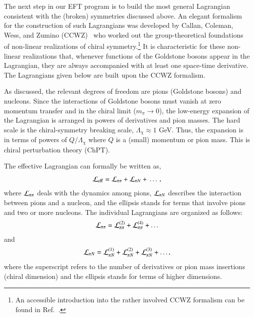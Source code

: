 \documentclass[sort&compress,preprint,3p]{elsarticle}
\begin{document}
The next step in our EFT program is to build the most general
Lagrangian consistent with the (broken) symmetries discussed
above.
An elegant formalism for the construction of such Lagrangians
was developed by 
Callan, Coleman, Wess, and Zumino (CCWZ)~\cite{CCWZ}
who worked out
the group-theoretical foundations 
of non-linear realizations of chiral symmetry.\footnote{An accessible introduction into the rather
involved CCWZ formalism can be found in Ref.~\cite{Sch03}.}
It is characteristic for these non-linear realizations that, whenever functions of the Goldstone bosons
appear in the Lagrangian, they are always accompanied with at least one
space-time derivative.
The Lagrangians given below are built upon the CCWZ
formalism. 

As discussed, the relevant degrees of freedom are
pions (Goldstone bosons) and nucleons.
Since the interactions of Goldstone bosons must
vanish at zero momentum transfer and in the chiral
limit ($m_\pi \rightarrow 0$), the low-energy expansion
of the Lagrangian is arranged in powers of derivatives
and pion masses.
The hard scale is the chiral-symmetry breaking
scale, $\Lambda_\chi \approx 1$ GeV. Thus, the expansion is in terms
of powers of $Q/\Lambda_\chi$ where $Q$ is a (small) momentum
or pion mass.
This is chiral perturbation theory (ChPT).

The effective Lagrangian can formally be written as,
\begin{equation}
{\cal L_{\rm eff}} 
=
{\cal L}_{\pi\pi} 
+
{\cal L}_{\pi N} 
 + \, \ldots \,,
\end{equation}
where ${\cal L}_{\pi\pi}$
deals with the dynamics among pions, 
${\cal L}_{\pi N}$ 
describes the interaction
between pions and a nucleon,
and the ellipsis stands for
terms that involve pions and two or more nucleons.
The individual Lagrangians are organized as follows:
\begin{equation}
{\cal L}_{\pi\pi} 
 = 
{\cal L}_{\pi\pi}^{(2)} 
 + {\cal L}_{\pi\pi}^{(4)} 
 + \ldots 
\end{equation}
and
\begin{equation}
{\cal L}_{\pi N} 
= 
{\cal L}_{\pi N}^{(1)} 
+
{\cal L}_{\pi N}^{(2)} 
+
{\cal L}_{\pi N}^{(3)} 
+ \ldots ,
\end{equation}
where the superscript refers to the number of derivatives or 
pion mass insertions (chiral dimension)
and the ellipsis stands for terms of higher dimensions.
\end{document}
